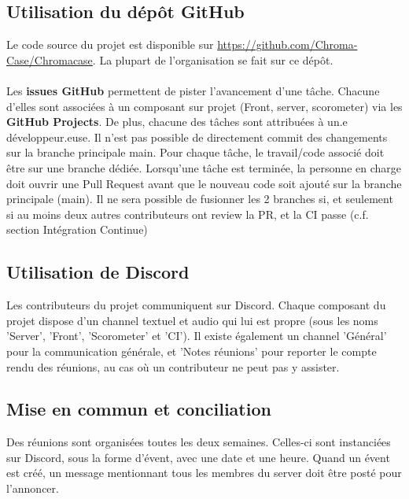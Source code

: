 \subsection{Utilisation du dépôt GitHub}
	Le code source du projet est disponible sur \url{https://github.com/Chroma-Case/Chromacase}.
	La plupart de l’organisation se fait sur ce dépôt.
	\\\\
	Les \textbf{issues GitHub} permettent de pister l’avancement d’une tâche. Chacune d’elles sont associées à un composant sur projet (Front, server, scorometer) via les \textbf{GitHub Projects}. De plus, chacune des tâches sont attribuées à un.e développeur.euse.
	Il n’est pas possible de directement commit des changements sur la branche principale main. Pour chaque tâche, le travail/code associé doit être sur une branche dédiée.
	Lorsqu’une tâche est terminée, la personne en charge doit ouvrir une Pull Request avant que le nouveau code soit ajouté sur la branche principale (main). Il ne sera possible de fusionner les 2 branches si, et seulement si au moins deux autres contributeurs ont review la PR, et la CI passe (c.f. section Intégration Continue)

\subsection{Utilisation de Discord}
	Les contributeurs du projet communiquent sur Discord. Chaque composant du projet dispose d’un channel textuel et audio qui lui est propre (sous les noms 'Server', 'Front', 'Scorometer' et 'CI'). Il existe également un channel 'Général' pour la communication générale, et 'Notes réunions' pour reporter le compte rendu des réunions, au cas où un contributeur ne peut pas y assister.

\subsection{Mise en commun et conciliation}
	Des réunions sont organisées toutes les deux semaines. Celles-ci sont instanciées sur Discord, sous la forme d'évent, avec une date et une heure. Quand un évent est créé, un message mentionnant tous les membres du server doit être posté pour l'annoncer.
